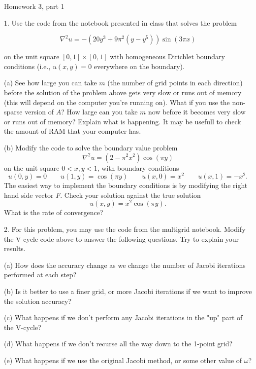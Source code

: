 \documentclass[12pt,english]{article}
\begin{document}
\begin{center}
{\large Homework 3, part 1}
\par\end{center}{\large \par}

1.  Use the code from the notebook presented in class that solves the problem

$$\nabla^2 u = -(20y^3+9\pi^2(y-y^5))\sin(3\pi x)$$  

on the unit square $[0,1]\times[0,1]$ with homogeneous Dirichlet boundary conditions (i.e., $u(x,y)=0$ everywhere on the boundary).

(a) See how large you can take $m$ (the number of grid points in each direction) before the solution of the problem above gets very slow or runs out of memory (this will depend on the computer you're running on). What if you use the non-sparse version of $A$? How large can you take $m$ now before it becomes very slow or runs out of memory? Explain what is happening.  It may be usefull to check the amount of RAM that your computer has.  

(b) Modify the code  to solve the boundary value problem
$$\nabla^2 u = (2-\pi^2 x^2)\cos(\pi y)$$
on the unit square $0<x,y<1$, with boundary conditions
$$u(0,y) = 0 \quad \quad u(1,y) = \cos(\pi y) \quad \quad u(x,0) = x^2 \quad \quad u(x,1)=-x^2.$$
The easiest way to implement the boundary conditions is by modifying the right hand side vector $F$.
Check your solution against the true solution $$u(x,y) = x^2 \cos(\pi y).$$  
What is the rate of convergence?  

2.  For this problem, you may use the code from the multigrid notebook.
Modify the V-cycle code above to answer the following questions. Try to explain your results.  

(a) How does the accuracy change as we change the number of Jacobi iterations performed at each step?  

(b) Is it better to use a finer grid, or more Jacobi iterations if we want to improve the solution accuracy?  

(c) What happens if we don't perform any Jacobi iterations in the "up" part of the V-cycle?  

(d) What happens if we don't recurse all the way down to the 1-point grid?  

(e) What happens if we use the original Jacobi method, or some other value of $\omega$?  
\end{document}
